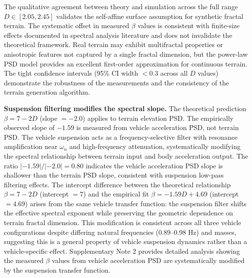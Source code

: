\documentclass[11pt]{article}
\begin{document}
The qualitative agreement between theory and simulation across the full range $D \in [2.05, 2.45]$ validates the self-affine surface assumption for synthetic fractal terrain. The systematic offset in measured $\beta$ values is consistent with finite-size effects documented in spectral analysis literature and does not invalidate the theoretical framework. Real terrain may exhibit multifractal properties or anisotropic features not captured by a single fractal dimension, but the power-law PSD model provides an excellent first-order approximation for continuous terrain\cite{Persson2005,ISO8608}. The tight confidence intervals (95\% CI width $< 0.3$ across all $D$ values) demonstrate the robustness of the measurements and the consistency of the terrain generation algorithm.

\textbf{Suspension filtering modifies the spectral slope.} The theoretical prediction $\beta = 7-2D$ (slope $= -2.0$) applies to terrain elevation PSD. The empirically observed slope of $-1.59$ is measured from vehicle acceleration PSD, not terrain PSD. The vehicle suspension acts as a frequency-selective filter with resonance amplification near $\omega_n$ and high-frequency attenuation, systematically modifying the spectral relationship between terrain input and body acceleration output. The ratio $|-1.59|/|-2.0| = 0.80$ indicates the vehicle acceleration PSD slope is shallower than the terrain PSD slope, consistent with suspension low-pass filtering effects. The intercept difference between the theoretical relationship $\beta = 7-2D$ (intercept $= 7$) and the empirical fit $\beta = -1.59D + 4.69$ (intercept $= 4.69$) arises from the same vehicle transfer function: the suspension filter shifts the effective spectral exponent while preserving the geometric dependence on terrain fractal dimension. This modification is consistent across all three vehicle configurations despite differing natural frequencies (0.89--0.98 Hz) and masses, suggesting this is a general property of vehicle suspension dynamics rather than a vehicle-specific effect. Supplementary Note 2 provides detailed analysis showing the measured $\beta$ values from vehicle acceleration PSD are systematically modified by the suspension transfer function.
\end{document}
